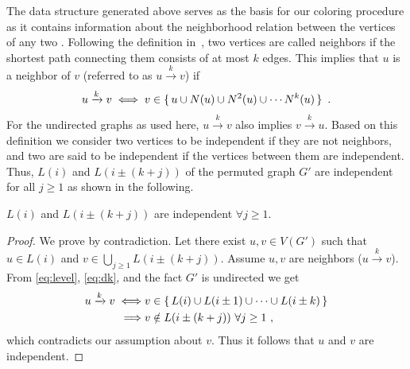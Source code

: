 The data structure generated above serves as the basis for our \DK coloring
procedure as it contains information about the neighborhood relation
between the vertices of any two \levels. Following the definition
in~\cite{dist_k_def}, two vertices are called \DK neighbors if the
shortest path connecting them consists of at most $k$ edges.
This implies that $u$ is a \DK neighbor of $v$ (referred to as
$u\xrightarrow{k}v$) if
\begin{equation}\label{eq:dk}
  u\xrightarrow{k}v  \iff  v \in \set{ u \cup N(u) \cup N^2(u) \cup \cdots N^k(u) }\eos
\end{equation}
For the undirected graphs as used here, $u\xrightarrow{k}v$
also implies $v\xrightarrow{k}u$. Based on this definition we consider
two vertices to be \DK independent if they are not \DK
neighbors, and two \levels are said to be \DK independent if the vertices between them are \DK independent. Thus, \levels $L(i)$ and $L(i\pm(k+j))$ of the permuted
graph $G'$ are \DK independent for all $j\geq1$ as shown in the
following.
\begin{corollary}\label{corollary_dk}
$L(i)$ and $L(i\pm(k+j))$ are \DK independent $\forall j\geq1$. 
\end{corollary}
\begin{proof}
  We prove by contradiction. Let there exist $u,v \in V(G')$ such that
  $u \in L(i)$ and $v \in \bigcup\limits_{j\geq 1}L(i \pm (k+j))$. Assume $u,v$
  are \DK neighbors ($u\xrightarrow{k}v$). From \cref{eq:level},
  \cref{eq:dk}, and the fact $G'$ is undirected we get
\begin{align*}
  u\xrightarrow{k}v \iff & v \in \set{L(i) \cup L(i \pm 1) \cup \cdots \cup L(i \pm k)} \\
  \implies & v \notin L(i \pm (k+j)) \text{  } \forall j \geq 1~,
\end{align*}
which contradicts our assumption about $v$\@.
Thus it follows that $u$ and $v$ are \DK independent.
\end{proof}

